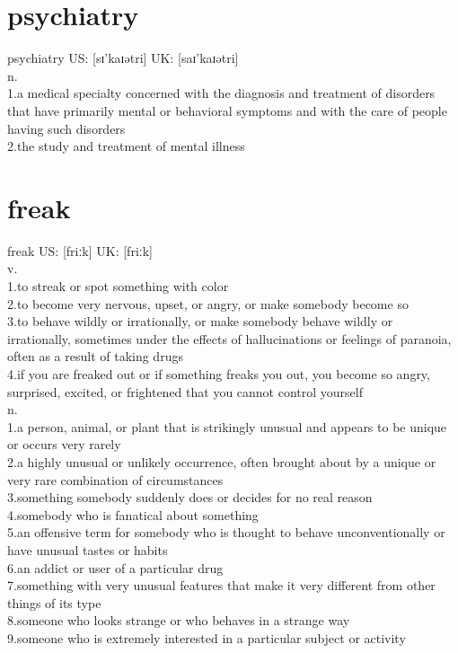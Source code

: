 \documentclass[11pt]{article}
\begin{document}
\section{psychiatry}
\label{sec:org1197396}
psychiatry US: [sɪ'kaɪətri] UK: [saɪ'kaɪətri]\\
n.\\
1.a medical specialty concerned with the diagnosis and treatment of disorders that have primarily mental or behavioral symptoms and with the care of people having such disorders\\
2.the study and treatment of mental illness\\
\section{freak}
\label{sec:org092f300}
freak US: [friːk] UK: [friːk]\\
v.\\
1.to streak or spot something with color\\
2.to become very nervous, upset, or angry, or make somebody become so\\
3.to behave wildly or irrationally, or make somebody behave wildly or irrationally, sometimes under the effects of hallucinations or feelings of paranoia, often as a result of taking drugs\\
4.if you are freaked out or if something freaks you out, you become so angry, surprised, excited, or frightened that you cannot control yourself\\
n.\\
1.a person, animal, or plant that is strikingly unusual and appears to be unique or occurs very rarely\\
2.a highly unusual or unlikely occurrence, often brought about by a unique or very rare combination of circumstances\\
3.something somebody suddenly does or decides for no real reason\\
4.somebody who is fanatical about something\\
5.an offensive term for somebody who is thought to behave unconventionally or have unusual tastes or habits\\
6.an addict or user of a particular drug\\
7.something with very unusual features that make it very different from other things of its type\\
8.someone who looks strange or who behaves in a strange way\\
9.someone who is extremely interested in a particular subject or activity\\
\end{document}
